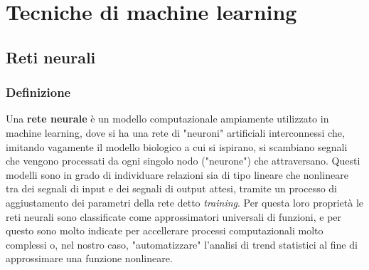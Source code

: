 \documentclass[binding=0.6cm]{sapthesis}
\begin{document}
	\chapter{Tecniche di machine learning}
		\section{Reti neurali}
			\subsection{Definizione}
				Una \textbf{rete neurale} è un modello computazionale ampiamente utilizzato in machine learning, dove si ha una rete di "neuroni" artificiali interconnessi che, imitando vagamente il
				modello biologico a cui si ispirano, si scambiano segnali che vengono processati da ogni singolo nodo ("neurone") che attraversano. Questi modelli sono in grado di individuare relazioni
				sia di tipo lineare che nonlineare tra dei segnali di input e dei segnali di output attesi, tramite un processo di aggiustamento dei parametri della rete detto \textit{training}. Per questa
				loro proprietà le reti neurali sono classificate come approssimatori universali di funzioni, e per questo sono molto indicate per accellerare processi computazionali molto complessi o, nel
				nostro caso, "automatizzare" l'analisi di trend statistici al fine di approssimare una funzione nonlineare.
\end{document}
